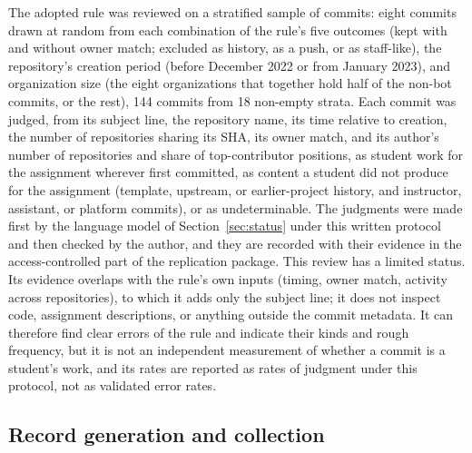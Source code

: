 \documentclass[acmsmall,screen,review,anonymous]{acmart}
\begin{document}
The adopted rule was reviewed on a stratified sample of commits: eight commits drawn at random from each combination of the rule's five outcomes (kept with and without owner match; excluded as history, as a push, or as staff-like), the repository's creation period (before December 2022 or from January 2023), and organization size (the eight organizations that together hold half of the non-bot commits, or the rest), 144 commits from 18 non-empty strata. Each commit was judged, from its subject line, the repository name, its time relative to creation, the number of repositories sharing its SHA, its owner match, and its author's number of repositories and share of top-contributor positions, as student work for the assignment wherever first committed, as content a student did not produce for the assignment (template, upstream, or earlier-project history, and instructor, assistant, or platform commits), or as undeterminable. The judgments were made first by the language model of Section~\ref{sec:status} under this written protocol and then checked by the author, and they are recorded with their evidence in the access-controlled part of the replication package. This review has a limited status. Its evidence overlaps with the rule's own inputs (timing, owner match, activity across repositories), to which it adds only the subject line; it does not inspect code, assignment descriptions, or anything outside the commit metadata. It can therefore find clear errors of the rule and indicate their kinds and rough frequency, but it is not an independent measurement of whether a commit is a student's work, and its rates are reported as rates of judgment under this protocol, not as validated error rates.

\subsection{Record generation and collection}
\label{sec:recordmethod}
\end{document}
